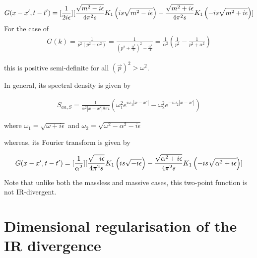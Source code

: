 \documentclass[aps,preprintnumbers,superscriptaddress,longbibliography]{revtex4-1}
\begin{document}
\begin{align}
    G(x-x',t-t') =[\frac{1}{2i\epsilon}]\large[ \frac{\sqrt{m^2-i\epsilon}}{4\pi^2s}K_1\left(is\sqrt{m^2-i\epsilon}\right)-\frac{\sqrt{m^2+i\epsilon}}{4\pi^2s}K_1\left(-is\sqrt{m^2+i\epsilon}\right)]
\end{align}
 For the case of
 \begin{align}
     G(k)=\frac{1}{p^2(p^2+\alpha^2)}=\frac{1}{(p^2+\frac{\alpha^2}{2})^2-\frac{\alpha^4}{4}}=\frac{1}{\alpha^2}\left(\frac{1}{p^2}-\frac{1}{p^2+\alpha^2}\right)
 \end{align}

this is positive semi-definite for all $(\vec{p})^2>\omega^2$.

In general, its spectral density is given by

\begin{align}
    S_{aa,S}=\frac{1}{\alpha^2|x-x'|8\pi i}(\omega_1^{2}e^{i\omega_1|x-x'|}-\omega_2^{2}e^{-i\omega_2|x-x'|})
\end{align}

where $\omega_1=\sqrt{\omega+i\epsilon}$ and $\omega_2=\sqrt{\omega^2-\alpha^2-i\epsilon}$

whereas, its Fourier transform is given by 

\begin{align}
    G(x-x',t-t') =[\frac{1}{\alpha^2}]\large[ \frac{\sqrt{-i\epsilon}}{4\pi^2s}K_1\left(is\sqrt{-i\epsilon}\right)-\frac{\sqrt{\alpha^2+i\epsilon}}{4\pi^2s}K_1\left(-is\sqrt{\alpha^2+i\epsilon}\right)]
\end{align}

Note that unlike both the massless and massive cases, this two-point function is not IR-divergent.



\section{Dimensional regularisation of the IR divergence}
\label{sec:dimreg}
\end{document}
